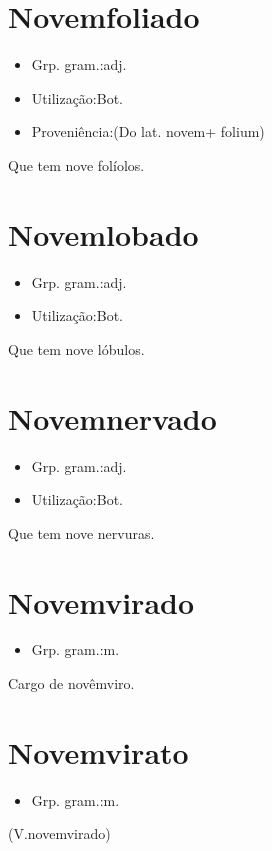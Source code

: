 \section{Novemfoliado}
\begin{itemize}
\item {Grp. gram.:adj.}
\end{itemize}
\begin{itemize}
\item {Utilização:Bot.}
\end{itemize}
\begin{itemize}
\item {Proveniência:(Do lat. \textunderscore novem\textunderscore  + \textunderscore folium\textunderscore )}
\end{itemize}
Que tem nove folíolos.
\section{Novemlobado}
\begin{itemize}
\item {Grp. gram.:adj.}
\end{itemize}
\begin{itemize}
\item {Utilização:Bot.}
\end{itemize}
Que tem nove lóbulos.
\section{Novemnervado}
\begin{itemize}
\item {Grp. gram.:adj.}
\end{itemize}
\begin{itemize}
\item {Utilização:Bot.}
\end{itemize}
Que tem nove nervuras.
\section{Novemvirado}
\begin{itemize}
\item {Grp. gram.:m.}
\end{itemize}
Cargo de novêmviro.
\section{Novemvirato}
\begin{itemize}
\item {Grp. gram.:m.}
\end{itemize}
(V.novemvirado)
